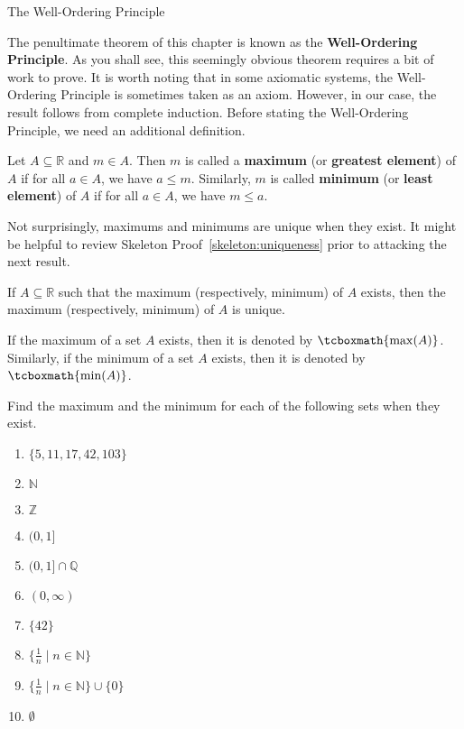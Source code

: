 \begin{section}{The Well-Ordering Principle}\label{sec:WOP}

The penultimate theorem of this chapter is known as the \textbf{Well-Ordering Principle}. As you shall see, this seemingly obvious theorem requires a bit of work to prove. It is worth noting that in some axiomatic systems, the Well-Ordering Principle is sometimes taken as an axiom.  However, in our case, the result follows from complete induction. Before stating the Well-Ordering Principle, we need an additional definition.

\begin{definition}
Let $A\subseteq \mathbb{R}$ and $m\in A$. Then $m$ is called a \textbf{maximum} (or \textbf{greatest element}) of $A$ if for all $a\in A$, we have $a\leq m$. Similarly, $m$ is called \textbf{minimum} (or \textbf{least element}) of $A$ if for all $a\in A$, we have $m\leq a$.
\end{definition}

Not surprisingly, maximums and minimums are unique when they exist. It might be helpful to review Skeleton Proof~\ref{skeleton:uniqueness} prior to attacking the next result.

\begin{theorem}
If $A\subseteq \mathbb{R}$ such that the maximum (respectively, minimum) of $A$ exists, then the maximum (respectively, minimum) of $A$ is unique.
\end{theorem}

If the maximum of a set $A$ exists, then it is denoted by $\tcboxmath{\max(A)}$. Similarly, if the minimum of a set $A$ exists, then it is denoted by $\tcboxmath{\min(A)}$.

\begin{problem}\label{prob:find max and min}
Find the maximum and the minimum for each of the following sets when they exist.
\begin{enumerate}[label=\textrm{(\alph*)}]
\item $\{5,11,17,42,103\}$ 
\item $\mathbb{N}$
\item $\mathbb{Z}$
\item $(0,1]$
\item $(0,1]\cap \mathbb{Q}$
\item $(0,\infty)$
\item $\{42\}$
\item $\{\frac{1}{n}\mid n\in\mathbb{N}\}$
\item $\{\frac{1}{n}\mid n\in\mathbb{N}\}\cup\{0\}$
\item $\emptyset$
\end{enumerate}
\end{problem}


\end{section}
